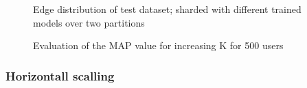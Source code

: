 \begin{figure}[h!]
	\centering
	
	\caption{Edge distribution of test dataset; sharded with different trained models over two partitions}
	\label{plot:edge-distribution}
\end{figure}


\begin{figure}[h!]
	\centering
	
	\caption{Evaluation of the MAP value for increasing K for 500 users}
	\label{plot:hyperparameter-recommendation-quality}
\end{figure}


\subsubsection{Horizontall scalling}
\label{subsubsec:eval-horizontall-scalling}

